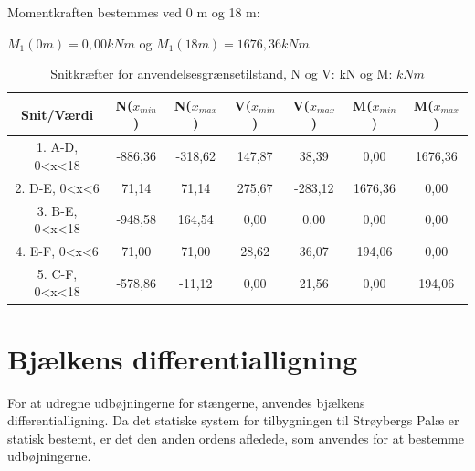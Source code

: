 Momentkraften bestemmes ved 0 m og 18 m:
\begin{center}
	$M_1(0m) = 0,\!00 kNm$ og $M_1(18m) = 1676,\!36 kNm$
\end{center}

\begin{table}
	\begin{center}
		\begin{tabular}{|c|c|c|c|c|c|c|}
			\hline
			Snit/Værdi & N($x_{min}$) & N($x_{max}$) & V($x_{min}$) & V($x_{max}$) & M($x_{min}$) & M($x_{max}$) 	\\ \hline
			1. A-D, 0<x<18 	& -886,36 	& -318,62 	&  147,87 	&  38,39 	&  0,00     &  1676,36        		\\ \hline
			2. D-E, 0<x<6  	&  71,14    &  71,14    &  275,67   & -283,12   &  1676,36  &  0,00    \\ \hline
			3. B-E, 0<x<18  & -948,58   &  164,54   &  0,00     &  0,00     &  0,00     &  0,00 			    \\ \hline
			4. E-F, 0<x<6   &  71,00    &  71,00    &  28,62    &  36,07    &  194,06   &  0,00     \\ \hline
			5. C-F, 0<x<18     & -578,86   & -11,12    &  0,00     &  21,56    &  0,00     &  194,06       		\\ \hline
		\end{tabular}
		\caption{Snitkræfter for anvendelsesgrænsetilstand, N og V: kN og M: $kNm$}
		\label{tab:anden2}
	\end{center}
\end{table}

\section{Bjælkens differentialligning}
For at udregne udbøjningerne for stængerne, anvendes bjælkens differentialligning. Da det statiske system for tilbygningen til Strøybergs Palæ er statisk bestemt, er det den anden ordens afledede, som anvendes for at bestemme udbøjningerne.